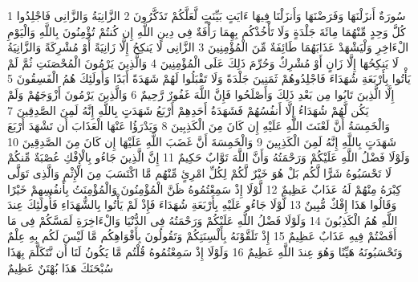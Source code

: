 \documentclass[20pt,a4paper]{article}
\title{}
\author{}
\date{}
\begin{document}
\pagecolor{cl_page}



{\tiny\colorbox{cl_aya}{1}} سُورَةٌ أَنزَلْنَهَا وَفَرَضْنَهَا وَأَنزَلْنَا فِيهَا ءَايَتٍ بَيِّنَتٍ لَّعَلَّكُمْ تَذَكَّرُونَ
{\tiny\colorbox{cl_aya}{2}} الزَّانِيَةُ وَالزَّانِى فَاجْلِدُوا كُلَّ وَحِدٍ مِّنْهُمَا مِائَةَ جَلْدَةٍ وَلَا تَأْخُذْكُم بِهِمَا رَأْفَةٌ فِى دِينِ اللَّهِ إِن كُنتُمْ تُؤْمِنُونَ بِاللَّهِ وَالْيَوْمِ الْءَاخِرِ وَلْيَشْهَدْ عَذَابَهُمَا طَائِفَةٌ مِّنَ الْمُؤْمِنِينَ
{\tiny\colorbox{cl_aya}{3}} الزَّانِى لَا يَنكِحُ إِلَّا زَانِيَةً أَوْ مُشْرِكَةً وَالزَّانِيَةُ لَا يَنكِحُهَا إِلَّا زَانٍ أَوْ مُشْرِكٌ وَحُرِّمَ ذَلِكَ عَلَى الْمُؤْمِنِينَ
{\tiny\colorbox{cl_aya}{4}} وَالَّذِينَ يَرْمُونَ الْمُحْصَنَتِ ثُمَّ لَمْ يَأْتُوا بِأَرْبَعَةِ شُهَدَاءَ فَاجْلِدُوهُمْ ثَمَنِينَ جَلْدَةً وَلَا تَقْبَلُوا لَهُمْ شَهَدَةً أَبَدًا وَأُولَئِكَ هُمُ الْفَسِقُونَ
{\tiny\colorbox{cl_aya}{5}} إِلَّا الَّذِينَ تَابُوا مِن بَعْدِ ذَلِكَ وَأَصْلَحُوا فَإِنَّ اللَّهَ غَفُورٌ رَّحِيمٌ
{\tiny\colorbox{cl_aya}{6}} وَالَّذِينَ يَرْمُونَ أَزْوَجَهُمْ وَلَمْ يَكُن لَّهُمْ شُهَدَاءُ إِلَّا أَنفُسُهُمْ فَشَهَدَةُ أَحَدِهِمْ أَرْبَعُ شَهَدَتٍ بِاللَّهِ إِنَّهُ لَمِنَ الصَّدِقِينَ
{\tiny\colorbox{cl_aya}{7}} وَالْخَمِسَةُ أَنَّ لَعْنَتَ اللَّهِ عَلَيْهِ إِن كَانَ مِنَ الْكَذِبِينَ
{\tiny\colorbox{cl_aya}{8}} وَيَدْرَؤُا عَنْهَا الْعَذَابَ أَن تَشْهَدَ أَرْبَعَ شَهَدَتٍ بِاللَّهِ إِنَّهُ لَمِنَ الْكَذِبِينَ
{\tiny\colorbox{cl_aya}{9}} وَالْخَمِسَةَ أَنَّ غَضَبَ اللَّهِ عَلَيْهَا إِن كَانَ مِنَ الصَّدِقِينَ
{\tiny\colorbox{cl_aya}{10}} وَلَوْلَا فَضْلُ اللَّهِ عَلَيْكُمْ وَرَحْمَتُهُ وَأَنَّ اللَّهَ تَوَّابٌ حَكِيمٌ
{\tiny\colorbox{cl_aya}{11}} إِنَّ الَّذِينَ جَاءُو بِالْإِفْكِ عُصْبَةٌ مِّنكُمْ لَا تَحْسَبُوهُ شَرًّا لَّكُم بَلْ هُوَ خَيْرٌ لَّكُمْ لِكُلِّ امْرِئٍ مِّنْهُم مَّا اكْتَسَبَ مِنَ الْإِثْمِ وَالَّذِى تَوَلَّى كِبْرَهُ مِنْهُمْ لَهُ عَذَابٌ عَظِيمٌ
{\tiny\colorbox{cl_aya}{12}} لَّوْلَا إِذْ سَمِعْتُمُوهُ ظَنَّ الْمُؤْمِنُونَ وَالْمُؤْمِنَتُ بِأَنفُسِهِمْ خَيْرًا وَقَالُوا هَذَا إِفْكٌ مُّبِينٌ
{\tiny\colorbox{cl_aya}{13}} لَّوْلَا جَاءُو عَلَيْهِ بِأَرْبَعَةِ شُهَدَاءَ فَإِذْ لَمْ يَأْتُوا بِالشُّهَدَاءِ فَأُولَئِكَ عِندَ اللَّهِ هُمُ الْكَذِبُونَ
{\tiny\colorbox{cl_aya}{14}} وَلَوْلَا فَضْلُ اللَّهِ عَلَيْكُمْ وَرَحْمَتُهُ فِى الدُّنْيَا وَالْءَاخِرَةِ لَمَسَّكُمْ فِى مَا أَفَضْتُمْ فِيهِ عَذَابٌ عَظِيمٌ
{\tiny\colorbox{cl_aya}{15}} إِذْ تَلَقَّوْنَهُ بِأَلْسِنَتِكُمْ وَتَقُولُونَ بِأَفْوَاهِكُم مَّا لَيْسَ لَكُم بِهِ عِلْمٌ وَتَحْسَبُونَهُ هَيِّنًا وَهُوَ عِندَ اللَّهِ عَظِيمٌ
{\tiny\colorbox{cl_aya}{16}} وَلَوْلَا إِذْ سَمِعْتُمُوهُ قُلْتُم مَّا يَكُونُ لَنَا أَن نَّتَكَلَّمَ بِهَذَا سُبْحَنَكَ هَذَا بُهْتَنٌ عَظِيمٌ
\end{document}
